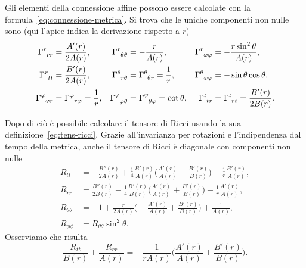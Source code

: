 Gli elementi della connessione affine possono essere calcolate con la
formula~\eqref{eq:connessione-metrica}.  Si trova che le uniche componenti non
nulle sono (qui l'apice indica la derivazione rispetto a $r$)
\begin{subequations}
  \begin{align}
    \tensor{\Gamma}{^{r}_{rr}} &= \frac{A'(r)}{2A(r)}, &
    \tensor{\Gamma}{^{r}_{\theta\theta}} &= -\frac{r}{A(r)}, &
    \tensor{\Gamma}{^{r}_{\phi\phi}} &= -\frac{r \sin^{2}\theta}{A(r)}, \\
    \tensor{\Gamma}{^{r}_{tt}} &= \frac{B'(r)}{2A(r)}, &
    \tensor{\Gamma}{^{\theta}_{r\theta}} &=
    \tensor{\Gamma}{^{\theta}_{\theta r}} = \frac{1}{r}, &
    \tensor{\Gamma}{^{\theta}_{\phi\phi}} &= -\sin\theta \cos\theta, \\
    \tensor{\Gamma}{^{\phi}_{\phi r}} &= \tensor{\Gamma}{^{\phi}_{r\phi}} =
    \frac{1}{r}, & \tensor{\Gamma}{^{\phi}_{\phi\theta}} &=
    \tensor{\Gamma}{^{\phi}_{\theta\phi}} = \cot\theta, &
    \tensor{\Gamma}{^{t}_{tr}} &= \tensor{\Gamma}{^{t}_{rt}} =
    \frac{B'(r)}{2B(r)}.
  \end{align}
\end{subequations}

Dopo di ciò è possibile calcolare il tensore di Ricci usando la sua
definizione~\eqref{eq:tens-ricci}.  Grazie all'invarianza per rotazioni e
l'indipendenza dal tempo della metrica, anche il tensore di Ricci è diagonale
con componenti non nulle
\begin{subequations}
  \label{eq:ricci-sferico}
  \begin{align}
    R_{tt} &= -\frac{B''(r)}{2A(r)} + \frac{1}{4} \frac{B'(r)}{A(r)}
    \bigg(\frac{A'(r)}{A(r)} + \frac{B'(r)}{B(r)}\bigg) -
    \frac{1}{r}\frac{B'(r)}{A(r)}, \\
    R_{rr} &= \frac{B''(r)}{2B(r)} - \frac{1}{4} \frac{B'(r)}{B(r)}
    \bigg(\frac{A'(r)}{A(r)} + \frac{B'(r)}{B(r)}\bigg) -
    \frac{1}{r}\frac{A'(r)}{A(r)}, \\
    R_{\theta\theta} &= -1 + \frac{r}{2A(r)}\bigg(-\frac{A'(r)}{A(r)} +
    \frac{B'(r)}{B(r)}\bigg) + \frac{1}{A(r)}, \\
    R_{\phi\phi} &= R_{\theta\theta} \sin^{2}\theta.
  \end{align}
\end{subequations}
Osserviamo che risulta
\begin{equation}
  \label{eq:bar}
  \frac{R_{tt}}{B(r)} + \frac{R_{rr}}{A(r)} =
  -\frac{1}{rA(r)}\bigg(\frac{A'(r)}{A(r)} + \frac{B'(r)}{B(r)}\bigg).
\end{equation}

